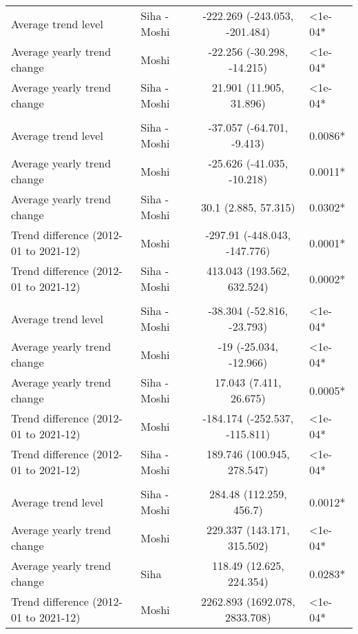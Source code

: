 \begin{longtable}{l|lcl}
\midrule\addlinespace[2.5pt]
\multicolumn{4}{l}{Neurological} \\[2.5pt] 
\midrule\addlinespace[2.5pt]
Average trend level & Siha - Moshi & -222.269 (-243.053, -201.484) & <1e-04* \\ 
Average yearly trend change & Moshi & -22.256 (-30.298, -14.215) & <1e-04* \\ 
Average yearly trend change & Siha - Moshi & 21.901 (11.905, 31.896) & <1e-04* \\ 
\midrule\addlinespace[2.5pt]
\multicolumn{4}{l}{Other Non-Communicable} \\[2.5pt] 
\midrule\addlinespace[2.5pt]
Average trend level & Siha - Moshi & -37.057 (-64.701, -9.413) & 0.0086* \\ 
Average yearly trend change & Moshi & -25.626 (-41.035, -10.218) & 0.0011* \\ 
Average yearly trend change & Siha - Moshi & 30.1 (2.885, 57.315) & 0.0302* \\ 
Trend difference (2012-01 to 2021-12) & Moshi & -297.91 (-448.043, -147.776) & 0.0001* \\ 
Trend difference (2012-01 to 2021-12) & Siha - Moshi & 413.043 (193.562, 632.524) & 0.0002* \\ 
\midrule\addlinespace[2.5pt]
\multicolumn{4}{l}{Respiratory Diseases} \\[2.5pt] 
\midrule\addlinespace[2.5pt]
Average trend level & Siha - Moshi & -38.304 (-52.816, -23.793) & <1e-04* \\ 
Average yearly trend change & Moshi & -19 (-25.034, -12.966) & <1e-04* \\ 
Average yearly trend change & Siha - Moshi & 17.043 (7.411, 26.675) & 0.0005* \\ 
Trend difference (2012-01 to 2021-12) & Moshi & -184.174 (-252.537, -115.811) & <1e-04* \\ 
Trend difference (2012-01 to 2021-12) & Siha - Moshi & 189.746 (100.945, 278.547) & <1e-04* \\ 
\midrule\addlinespace[2.5pt]
\multicolumn{4}{l}{Respiratory Infections} \\[2.5pt] 
\midrule\addlinespace[2.5pt]
Average trend level & Siha - Moshi & 284.48 (112.259, 456.7) & 0.0012* \\ 
Average yearly trend change & Moshi & 229.337 (143.171, 315.502) & <1e-04* \\ 
Average yearly trend change & Siha & 118.49 (12.625, 224.354) & 0.0283* \\ 
Trend difference (2012-01 to 2021-12) & Moshi & 2262.893 (1692.078, 2833.708) & <1e-04* \\ 

\end{longtable}
